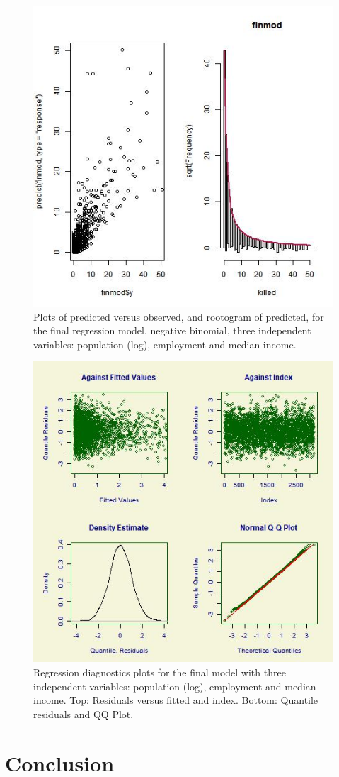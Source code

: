 \documentclass[sigconf]{acmart}
\begin{document}
\begin{figure}
\includegraphics[width=1.0\textwidth]{images/figure2.jpg}
\caption{Plots of predicted versus observed, and rootogram of predicted, for the final regression model, negative binomial, three independent variables: population (log), employment and median income.}
\end{figure}

\begin{figure}
\includegraphics[width=1.0\textwidth]{images/figure3.jpg}
\caption{Regression diagnostics plots for the final model with three independent variables: population (log), employment and median income. Top: Residuals versus fitted and index.  Bottom: Quantile residuals and QQ Plot. }
\end{figure}


\section{Conclusion}

 
\end{document}
